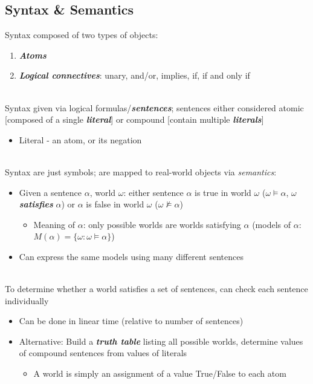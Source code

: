 \documentclass[12pt]{extarticle}
\theoremstyle{definition}
\theoremstyle{remark}
\newcommand{\pstart}[0]{\noindent}
\newcommand{\newp}[0]{~\\ \pstart}
\newcommand{\term}[1]{\noindent\textbf{\textit{#1}}}
\begin{document}
\subsection{Syntax \& Semantics}
\pstart 
Syntax composed of two types of objects: \begin{enumerate}
    \item \term{Atoms}
    \item \term{Logical connectives}: unary, and/or, implies, if, if and only if
\end{enumerate}

\newp
Syntax given via logical formulas/\term{sentences}; sentences either considered atomic [composed of a single \term{literal}] or compound [contain multiple \term{literals}] \begin{itemize}
    \item Literal - an atom, or its negation
\end{itemize}

\newp
Syntax are just symbols; are mapped to real-world objects via \textit{semantics}: \begin{itemize}
    \item Given a sentence $\alpha$, world $\omega$: either sentence $\alpha$ is true in world $\omega$ (\ul{$\omega\models\alpha$}, $\omega$ \term{satisfies} $\alpha$) or $\alpha$ is false in world $\omega$ (\ul{$\omega\not\models\alpha$}) \begin{itemize}
        \item Meaning of $\alpha$: only possible worlds are worlds satisfying $\alpha$ (models of $\alpha$: $M(\alpha)=\{\omega:\omega\models\alpha\}$)
    \end{itemize}
    \item Can express the same models using many different sentences
\end{itemize}

\newp
To determine whether a world satisfies a set of sentences, can check each sentence individually \begin{itemize}
    \item Can be done in linear time (relative to number of sentences)
    \item Alternative: Build a \term{truth table} listing all possible worlds, determine values of compound sentences from values of literals \begin{itemize}
        \item A world is simply an assignment of a value True/False to each atom
    \end{itemize}
\end{itemize}
\end{document}
